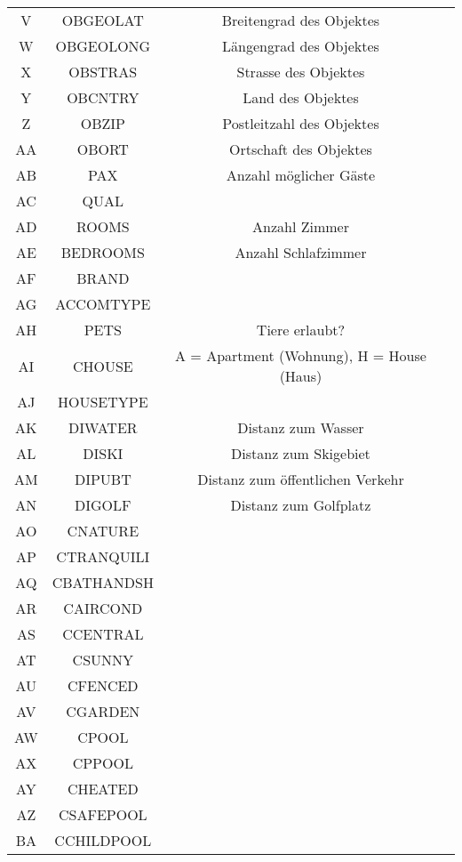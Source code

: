 \begin{longtable}{ | c | c | c | c |}
	\rowcolor{tableheadcolor}
	\multicolumn{3}{|c|}{\textbf{Objektdaten}} \\ \hline
	V & OBGEOLAT & Breitengrad des Objektes \\ \hline 
	W & OBGEOLONG & Längengrad des Objektes \\ \hline 
	X & OBSTRAS & Strasse des Objektes \\ \hline 
	Y & OBCNTRY & Land des Objektes \\ \hline 
	Z & OBZIP & Postleitzahl des Objektes \\ \hline 
	AA & OBORT & Ortschaft des Objektes \\ \hline 
	AB & PAX & Anzahl möglicher Gäste \\ \hline 
	AC & QUAL &  \\ \hline 
	AD & ROOMS & Anzahl Zimmer \\ \hline 
	AE & BEDROOMS & Anzahl Schlafzimmer \\ \hline 
	AF & BRAND &  \\ \hline 
	AG & ACCOMTYPE &  \\ \hline 
	AH & PETS & Tiere erlaubt? \\ \hline 
	AI & CHOUSE & A = Apartment (Wohnung), H = House (Haus) \\ \hline 
	AJ & HOUSETYPE &  \\ \hline 
	AK & DIWATER & Distanz zum Wasser \\ \hline 
	AL & DISKI & Distanz zum Skigebiet \\ \hline 
	AM & DIPUBT & Distanz zum öffentlichen Verkehr \\ \hline 
	AN & DIGOLF & Distanz zum Golfplatz \\ \hline 
	AO & CNATURE &  \\ \hline 
	AP & CTRANQUILI &  \\ \hline 
	AQ & CBATHANDSH &  \\ \hline 
	AR & CAIRCOND &  \\ \hline 
	AS & CCENTRAL &  \\ \hline 
	AT & CSUNNY &  \\ \hline 
	AU & CFENCED &  \\ \hline 
	AV & CGARDEN &  \\ \hline 
	AW & CPOOL &  \\ \hline 
	AX & CPPOOL &  \\ \hline 
	AY & CHEATED &  \\ \hline 
	AZ & CSAFEPOOL &  \\ \hline 
	BA & CCHILDPOOL &  \\ \hline 

\end{longtable}
